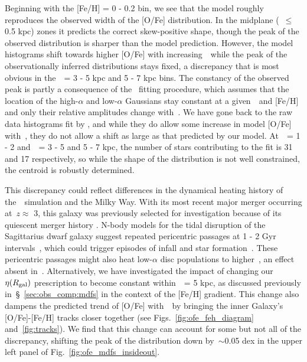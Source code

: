 \documentclass[draft2.tex]{subfiles}
\begin{document}
Beginning with the [Fe/H] = 0 - 0.2 bin, we see that the model roughly 
reproduces the observed width of the [O/Fe] distribution. 
In the midplane (\absz~$\leq$ 0.5 kpc) zones it predicts the correct 
skew-positive shape, though the peak of the observed distribution is sharper 
than the model prediction. However, the model histograms shift towards higher 
[O/Fe] with increasing~\absz~while the peak of the observationally inferred 
distributions stays fixed, a discrepancy that is most obvious in the~\rgal~= 
3 - 5 kpc and 5 - 7 kpc bins. The constancy of the observed peak is partly 
a consequence of the~\citet{Vincenzo2021a} fitting procedure, which assumes 
that the location of the high-$\alpha$ and low-$\alpha$ Gaussians stay 
constant at a given~\rgal~and [Fe/H] and only their relative amplitudes change 
with~\absz. We have gone back to the raw data histograms fit by 
\citet{Vincenzo2021a}, and while they do allow some increase in model [O/Fe] 
with~\absz, they do not allow a shift as large as that predicted by our model. 
At~\absz~= 1 - 2 and~\rgal~= 3 - 5 and 5 - 7 kpc, the number of stars 
contributing to the fit is 31 and 17 respectively, so while the shape of the 
distribution is not well constrained, the centroid is robustly determined. 
\par 
This discrepancy could reflect differences in the dynamical heating history 
of the~\hsim~simulation and the Milky Way. 
With its most recent major merger occurring at~$z \approx$ 3, this galaxy was 
previously selected for investigation because of its quiescent merger history 
\citep[e.g.][]{Zolotov2012}. N-body models for the tidal disruption of the 
Sagittarius dwarf galaxy suggest repeated pericentric passages at 1 - 2 Gyr 
intervals~\citep{Law2010}, which could trigger episodes of infall and star 
formation~\citep[e.g.][]{RuizLara2020}. 
These pericentric passages might also heat low-$\alpha$ disc populations to 
higher~\absz, an effect absent in~\hsim. 
Alternatively, we have investigated the impact of changing our~$\eta(R_\text{gal})$ 
prescription to become constant within~\rgal~= 5 kpc, as discussed previously 
in~\S~\ref{sec:obs_comp:mdfs} in the context of the [Fe/H] gradient. 
This change also dampens the predicted trend of [O/Fe] with~\absz~by bringing 
the inner Galaxy's [O/Fe]-[Fe/H] tracks closer together (see 
Figs.~\ref{fig:ofe_feh_diagram} and~\ref{fig:tracks}). 
We find that this change can account for some but not all of the discrepancy, 
shifting the peak of the distribution down by~$\sim$0.05 dex in the upper left 
panel of Fig.~\ref{fig:ofe_mdfs_insideout}. 
\end{document}

